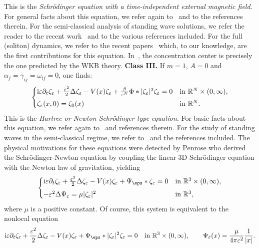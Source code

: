 \documentclass[11pt]{amsart}
\numberwithin{equation}{section}
\theoremstyle{definition}
\begin{document}
This is the {\em Schr\"odinger equation with a time-independent external magnetic field}. For general
facts about this equation, we refer again to~\cite{cazenave} and to the references therein.
For the semi-classical analysis of standing wave solutions, we refer the reader to the recent work~\cite{cjs}
and to the various references included. For the full (soliton) dynamics, we refer to the recent papers~\cite{selvit,squa}
which, to our knowledge, are the first contributions for this equation. In~\cite{squa}, the concentration center
is precisely the one predicted by the WKB theory.
\vskip4pt
\noindent
{\bf Class III.}
If $m=1$, $A=0$ and $\alpha_j=\gamma_{ij}=\omega_{ij}=0$, one finds:
    \begin{equation*}
    \begin{cases}       {{\rm i}}{\varepsilon}\partial_t\zeta_{\varepsilon}+\frac{{\varepsilon}^2}{2}\Delta\zeta_{\varepsilon}-V(x)\zeta_{\varepsilon}
        +\frac{\beta}{{\varepsilon}^N}\Phi*|\zeta_{\varepsilon}|^{2}\zeta_{\varepsilon}=0 & \text{in ${{\mathbb R}}^N\times(0,\infty)$,} \\
        \noalign{\vskip3pt}
        \zeta_{\varepsilon}(x,0)=\zeta_0(x) & \text{in ${{\mathbb R}}^N$}.
    \end{cases}
\end{equation*}
This is the {\em Hartree or Newton-Schr\"odinger type equation}. For basic facts about this equation, we
refer again to~\cite{cazenave} and references therein. For the study of standing waves in the semi-classical
regime, we refer to~\cite{WiWe} and the references included. The physical motivations for these equations
were detected by Penrose who derived the Schr\"odinger-Newton equation
by coupling the linear 3D Schr\"odinger equation with the Newton law of gravitation, yielding
\begin{equation*}
    \begin{cases}
{{\rm i}} {\varepsilon} \partial_t\zeta_{\varepsilon}+\frac{{\varepsilon}^2}{2}\Delta\zeta_{\varepsilon}-V(x)\zeta_{\varepsilon}+\Psi_\eps*\zeta_{\varepsilon}=0
& \text{in ${{\mathbb R}}^3\times (0,\infty)$},\\
\noalign{\vskip4pt}
-{\varepsilon}^2\Delta \Psi_{\varepsilon}=\mu |\zeta_{\varepsilon}|^2    & \text{in ${{\mathbb R}}^3$},
\end{cases}
\end{equation*}
where $\mu$ is a positive constant.
Of course, this system is equivalent to the nonlocal equation
\begin{equation*}
{{\rm i}} {\varepsilon} \partial_t\zeta_{\varepsilon}+\frac{{\varepsilon}^2}{2}\Delta\zeta_{\varepsilon}-V(x)\zeta_{\varepsilon}+
\Psi_\eps*|\zeta_{\varepsilon}|^2\zeta_{\varepsilon}=0\quad\text{in ${{\mathbb R}}^3\times (0,\infty)$},
\qquad
\Psi_{\varepsilon}(x)=\frac{\mu}{4\pi{\varepsilon}^{2}}\frac{1}{|x|}.
\end{equation*}
\end{document}
